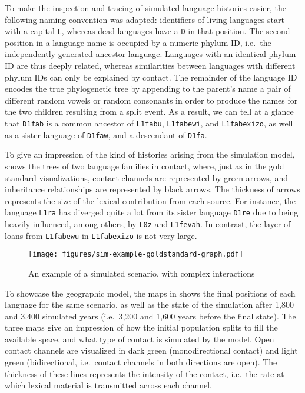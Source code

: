 To make the inspection and tracing of simulated language histories easier, the following naming convention was adapted: identifiers of living languages start with a capital \texttt{L}, whereas dead languages have a \texttt{D} in that position. The second position in a language name is occupied by a numeric phylum ID, i.e.\ the independently generated ancestor language. Languages with an identical phylum ID are thus deeply related, whereas similarities between languages with different phylum IDs can only be explained by contact. The remainder of the language ID encodes the true phylogenetic tree by appending to the parent's name a pair of different random vowels or random consonants in order to produce the names for the two children resulting from a split event. As a result, we can tell at a glance that \texttt{D1fab} is a common ancestor of \texttt{L1fabu}, \texttt{L1fabewi}, and \texttt{L1fabexizo}, as well as a sister language of \texttt{D1faw}, and a descendant of \texttt{D1fa}.

To give an impression of the kind of histories arising from the simulation model,  shows the trees of two language families in contact, where, just as in the gold standard visualizations, contact channels are represented by green arrows, and inheritance relationships are represented by black arrows. The thickness of arrows represents the size of the lexical contribution from each source. For instance, the language \texttt{L1ra} has diverged quite a lot from its sister language \texttt{D1re} due to being heavily influenced, among others, by \texttt{L0z} and \texttt{L1fevah}. In contrast, the layer of loans from \texttt{L1fabewu} in \texttt{L1fabexizo} is not very large.

\begin{figure}
 \begin{center}
 \texttt{[image: figures/sim-example-goldstandard-graph.pdf]}
 \caption{An example of a simulated scenario, with complex interactions}
 \label{simulated-tree}
 \end{center}
\end{figure}

To showcase the geographic model, the maps in  shows the final positions of each language for the same scenario, as well as the state of the simulation after 1,800 and 3,400 simulated years (i.e.\ 3,200 and 1,600 years before the final state). The three maps give an impression of how the initial population splits to fill the available space, and what type of contact is simulated by the model. Open contact channels are visualized in dark green (monodirectional contact) and light green (bidirectional, i.e.\ contact channels in both directions are open). The thickness of these lines represents the intensity of the contact, i.e.\ the rate at which lexical material is transmitted across each channel.

